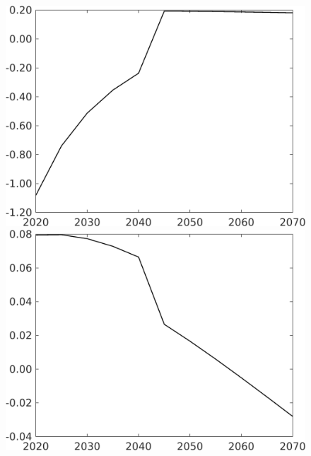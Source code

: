 \documentclass[12pt]{article}
\begin{document}
\begin{figure}[h!!]
\begin{minipage}[]{0.32\textwidth}
	\end{minipage}		
	\begin{minipage}[]{0.32\textwidth}
		\includegraphics[width=1\textwidth]{../../codding_model/own_basedOnFried/optimalPol_010922_revision/figures/all_13Sept22/CompTaufPER_bytaul_Reg0_gAg_spillover0_nsk1_xgr0_knspil0_sep1_LFlimit1_emsbase0_countec0_GovRev0_etaa0.79_lgd0.png}
	\end{minipage}
	\begin{minipage}[]{0.32\textwidth}
		\includegraphics[width=1\textwidth]{../../codding_model/own_basedOnFried/optimalPol_010922_revision/figures/all_13Sept22/CompTaufPER_bytaul_Reg0_gAn_spillover0_nsk1_xgr0_knspil0_sep1_LFlimit1_emsbase0_countec0_GovRev0_etaa0.79_lgd0.png}

\end{minipage}
\end{figure}
\end{document}
